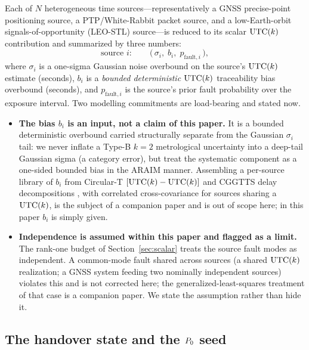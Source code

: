 Each of $N$ heterogeneous time sources---representatively a GNSS precise-point
positioning source, a PTP/White-Rabbit packet source, and a low-Earth-orbit
signals-of-opportunity (LEO-STL) source---is reduced to its scalar $\mathrm{UTC}(k){}$
contribution and summarized by three numbers:
\begin{equation}
  \text{source } i:\qquad
  \big(\,\sigma_i,\; b_i,\; p_{\mathrm{fault},i}\,\big),
  \label{eq:source}
\end{equation}
where $\sigma_i$ is a one-sigma Gaussian noise overbound on the source's $\mathrm{UTC}(k){}$
estimate (seconds), $b_i$ is a \emph{bounded deterministic} $\mathrm{UTC}(k){}$ traceability
bias overbound (seconds), and $p_{\mathrm{fault},i}$ is the source's prior fault
probability over the exposure interval. Two modelling commitments are load-bearing
and stated now.
\begin{itemize}
  \item \textbf{The bias $b_i$ is an input, not a claim of this paper.} It is a
  bounded deterministic overbound carried structurally separate from the Gaussian
  $\sigma_i$ tail: we never inflate a Type-B $k=2$ metrological uncertainty into a
  deep-tail Gaussian sigma (a category error), but treat the systematic component
  as a one-sided bounded bias in the ARAIM manner. Assembling a per-source library
  of $b_i$ from Circular-T $[\mathrm{UTC}(k){}-\mathrm{UTC}(k){}]$ and CGGTTS delay decompositions
  \citep{bipmcirculart,defraigne2015,panfilo2019}, with correlated
  cross-covariance for sources sharing a $\mathrm{UTC}(k){}$, is the subject of a companion
  paper and is out of scope here; in this paper $b_i$ is simply given.
  \item \textbf{Independence is assumed within this paper and flagged as a
  limit.} The rank-one budget of Section~\ref{sec:scalar} treats the source fault
  modes as independent. A common-mode fault shared across sources (a shared
  $\mathrm{UTC}(k){}$ realization; a GNSS system feeding two nominally independent sources)
  violates this and is not corrected here; the generalized-least-squares treatment
  of that case is a companion paper. We state the assumption rather than hide it.
\end{itemize}

\subsection{The handover state and the $P_0$ seed}
\label{sec:handover}

